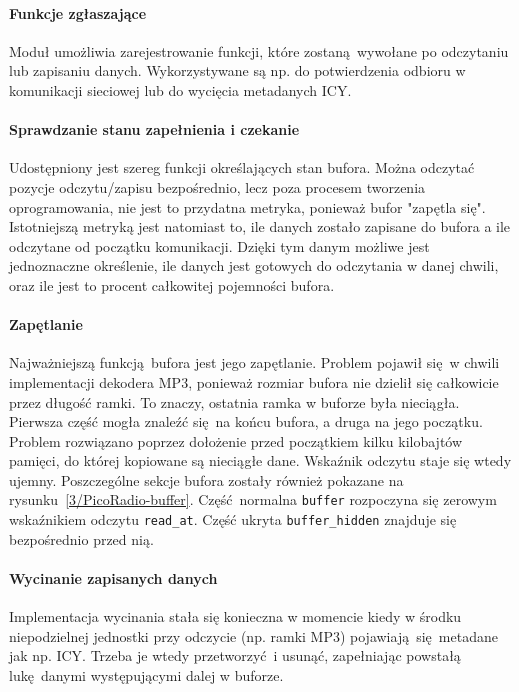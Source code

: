 \documentclass[polish]{aghengthesis}
\begin{document}
		\paragraph{Funkcje zgłaszające}
			Moduł umożliwia zarejestrowanie funkcji, które zostaną wywołane po odczytaniu lub zapisaniu danych. Wykorzystywane są np. do potwierdzenia odbioru w komunikacji sieciowej lub do wycięcia metadanych ICY.
		
		\paragraph{Sprawdzanie stanu zapełnienia i czekanie}
			Udostępniony jest szereg funkcji określających stan bufora. Można odczytać pozycje odczytu/zapisu bezpośrednio, lecz poza procesem tworzenia oprogramowania, nie jest to przydatna metryka, ponieważ bufor "zapętla się". Istotniejszą metryką jest natomiast to, ile danych zostało zapisane do bufora a ile odczytane od początku komunikacji. Dzięki tym danym możliwe jest jednoznaczne określenie, ile danych jest gotowych do odczytania w danej chwili, oraz ile jest to procent całkowitej pojemności bufora.
		
		\paragraph{Zapętlanie}
			Najważniejszą funkcją bufora jest jego zapętlanie. Problem pojawił się w chwili implementacji dekodera MP3, ponieważ rozmiar bufora nie dzielił się całkowicie przez długość ramki. To znaczy, ostatnia ramka w buforze była nieciągła. Pierwsza część mogła znaleźć się na końcu bufora, a druga na jego początku. Problem rozwiązano poprzez dołożenie przed początkiem kilku kilobajtów pamięci, do której kopiowane są nieciągłe dane. Wskaźnik odczytu staje się wtedy ujemny. Poszczególne sekcje bufora zostały również pokazane na rysunku~\ref{3/PicoRadio-buffer}. Część normalna \lstinline|buffer| rozpoczyna się zerowym wskaźnikiem odczytu \lstinline|read_at|. Część ukryta \lstinline|buffer_hidden| znajduje się bezpośrednio przed nią.
		
		\paragraph{Wycinanie zapisanych danych}
			Implementacja wycinania stała się konieczna w momencie kiedy w środku niepodzielnej jednostki przy odczycie (np. ramki MP3) pojawiają się metadane jak np. ICY. Trzeba je wtedy przetworzyć i usunąć, zapełniając powstałą lukę danymi występującymi dalej w buforze.
	
\end{document}
